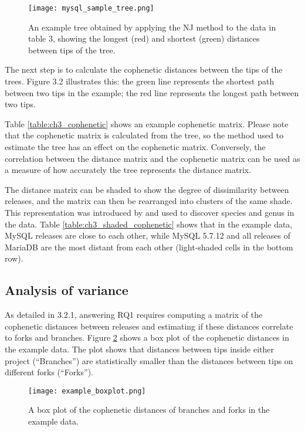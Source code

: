 \begin{figure}[H]
  \centering
  \texttt{[image: mysql\_sample\_tree.png]}
  \caption{An example tree obtained by applying the NJ method to the data in table 3, showing the longest (red) and shortest (green) distances between tips of the tree.}
  \label{fig:sample_tree}
\end{figure}

The next step is to calculate the cophenetic distances between the tips of the trees. Figure 3.2 illustrates this: the green line represents the shortest path between two tips in the example; the red line represents the longest path between two tips.

Table \ref{table:ch3_cophenetic} shows an example cophenetic matrix. Please note that the cophenetic matrix is calculated from the tree, so the method used to estimate the tree has an effect on the cophenetic matrix. Conversely, the correlation between the distance matrix and the cophenetic matrix can be used as a measure of how accurately the tree represents the distance matrix.



The distance matrix can be shaded to show the degree of dissimilarity between releases, and the matrix can then be rearranged into clusters of the same shade. This representation was introduced by \citet{Sneath1962a} and used to discover species and genus in the data. Table \ref{table:ch3_shaded_cophenetic} shows that in the example data, MySQL releases are close to each other, while MySQL 5.7.12 and all releases of MariaDB are the most distant from each other (light-shaded cells in the bottom row).



\subsection{Analysis of variance}
As detailed in 3.2.1, answering RQ1 requires computing a matrix of the cophenetic distances between releases and estimating if these distances correlate to forks and branches. Figure \ref{fig:example_boxplot} shows a box plot of the cophenetic distances in the example data. The plot shows that distances between tips inside either project (“Branches”) are statistically smaller than the distances between tips on different forks (“Forks”).

\begin{figure}[H]
  \centering
  \texttt{[image: example\_boxplot.png]}
  \caption{A box plot of the cophenetic distances of branches and forks in the example data.}
  \label{fig:example_boxplot}
\end{figure}

